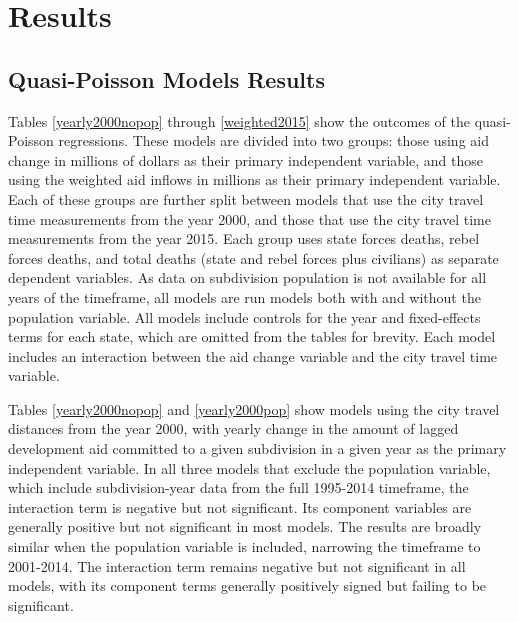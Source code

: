 \documentclass[12pt, letterpaper]{article}
\begin{document}
\section{Results}
\subsection{Quasi-Poisson Models Results}

Tables \ref{yearly2000nopop} through \ref{weighted2015} show the outcomes of the quasi-Poisson regressions. These models are divided into two groups: those using aid change in millions of dollars as their primary independent variable, and those using the weighted aid inflows in millions as their primary independent variable. Each of these groups are further split between models that use the city travel time measurements from the year 2000, and those that use the city travel time measurements from the year 2015. Each group uses state forces deaths, rebel forces deaths, and total deaths (state and rebel forces plus civilians) as separate dependent variables. As data on subdivision population is not available for all years of the timeframe, all models are run models both with and without the population variable. All models include controls for the year and fixed-effects terms for each state, which are omitted from the tables for brevity. Each model includes an interaction between the aid change variable and the city travel time variable.

Tables \ref{yearly2000nopop} and \ref{yearly2000pop} show models using the city travel distances from the year 2000, with yearly change in the amount of lagged development aid committed to a given subdivision in a given year as the primary independent variable. In all three models that exclude the population variable, which include subdivision-year data from the full 1995-2014 timeframe, the interaction term is negative but not significant. Its component variables are generally positive but not significant in most models. The results are broadly similar when the population variable is included, narrowing the timeframe to 2001-2014. The interaction term remains negative but not significant in all models, with its component terms generally positively signed but failing to be significant.
\end{document}
